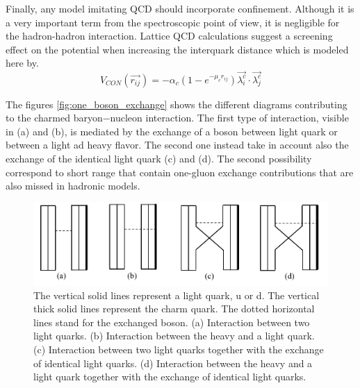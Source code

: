 \documentclass[12pt,a4paper]{book}
\begin{document}
	Finally, any model imitating QCD should incorporate confinement. Although it is a very important term from the spectroscopic point of view, it is negligible for the hadron-hadron interaction. Lattice QCD calculations suggest a screening effect on the potential when increasing the interquark distance which is modeled here by.
	\begin{equation}
		V_{CON}(\vec{r_{ij}})= -\alpha_c (1-e^{-\mu_c r_{ij}}) \vec{\lambda_i^c} \cdot \vec{\lambda_j^c}
		\label{eq:confinement}
	\end{equation}
	
	The figures \ref{fig:one_boson_exchange} shows the different diagrams contributing to the charmed baryon−nucleon interaction. The first type of interaction, visible in (a) and (b), is mediated by the exchange of a boson between light quark or between a light ad heavy flavor. The second one instead take in account also the exchange of the identical light quark (c) and (d). The second possibility correspond to short range that contain one-gluon exchange contributions that are also missed in hadronic models.
	
	\begin{figure}[ht]
		\centering
		\includegraphics[width=0.7\linewidth]{pictures/charmed_nucleos_interaction.png}
		\caption{ The vertical solid lines represent a light quark, u or d. The vertical thick solid lines represent the charm quark. The dotted horizontal lines stand for the exchanged boson. (a) Interaction between	two light quarks. (b) Interaction between the heavy and a light quark. (c) Interaction between	two light quarks together with the exchange of identical light quarks. (d) Interaction between the		heavy and a light quark together with the exchange of identical light quarks.}
		\label{fig:charmed_nucleos_interaction} 
	\end{figure}
	
\end{document}
